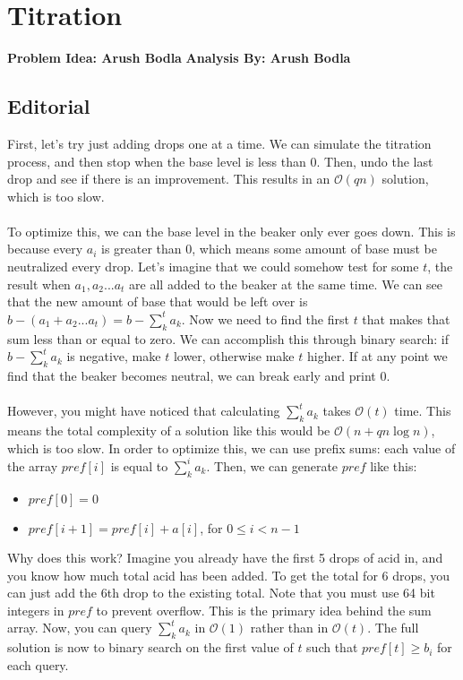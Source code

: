 \documentclass{article}
\begin{document}
\section{Titration}
\textbf{Problem Idea: Arush Bodla}
\textbf{Analysis By: Arush Bodla}
\subsection{Editorial}
First, let's try just adding drops one at a time. We can simulate the titration process, and then stop when the base level is less than 0. Then, undo the last drop and see if there is an improvement. This results in an $\mathcal{O}(qn)$ solution, which is too slow.\\\\
To optimize this, we can the base level in the beaker only ever goes down. This is because every $a_i$ is greater than 0, which means some amount of base must be neutralized every drop. Let's imagine that we could somehow test for some $t$, the result when $a_1,a_2...a_t$ are all added to the beaker at the same time. We can see that the new amount of base that would be left over is $b-(a_1+a_2...a_t)=b-\sum_k^ta_k$. Now we need to find the first $t$ that makes that sum less than or equal to zero. We can accomplish this through binary search: if $b-\sum_k^ta_k$ is negative, make $t$ lower, otherwise make $t$ higher. If at any point we find that the beaker becomes neutral, we can break early and print 0.\\\\
However, you might have noticed that calculating $\sum_k^ta_k$ takes $\mathcal{O}(t)$ time. This means the total complexity of a solution like this would be $\mathcal{O}(n+qn\log n)$, which is too slow. In order to optimize this, we can use prefix sums: each value of the array $pref[i]$ is equal to $\sum_k^ia_k$. Then, we can generate $pref$ like this:
\begin{itemize}
    \item $pref[0] = 0$
    \item $pref[i+1] = pref[i]+a[i]$, for $0\leq i<n-1$
\end{itemize}
Why does this work? Imagine you already have the first 5 drops of acid in, and you know how much total acid has been added. To get the total for 6 drops, you can just add the 6th drop to the existing total. Note that you must use 64 bit integers in $pref$ to prevent overflow. This is the primary idea behind the sum array. Now, you can query $\sum_k^ta_k$ in $\mathcal{O}(1)$ rather than in $\mathcal{O}(t)$. The full solution is now to binary search on the first value of $t$ such that $pref[t] \geq b_i$ for each query.
\end{document}
